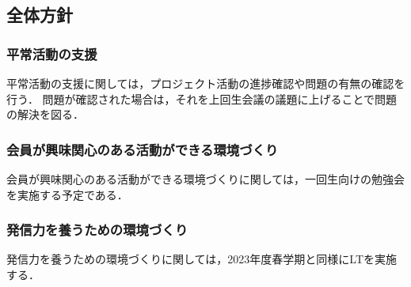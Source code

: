 \subsection*{全体方針}


\subsubsection*{平常活動の支援}
平常活動の支援に関しては，プロジェクト活動の進捗確認や問題の有無の確認を行う．
問題が確認された場合は，それを上回生会議の議題に上げることで問題の解決を図る．

\subsubsection*{会員が興味関心のある活動ができる環境づくり}
会員が興味関心のある活動ができる環境づくりに関しては，一回生向けの勉強会を実施する予定である．

\subsubsection*{発信力を養うための環境づくり}
発信力を養うための環境づくりに関しては，2023年度春学期と同様にLTを実施する．
